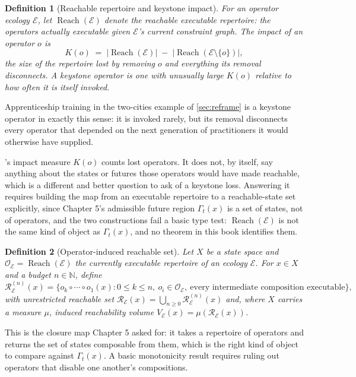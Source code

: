 \documentclass[12pt]{report}
\newtheorem{definition}{Definition}[section]
\newcommand{\Reach}{\ensuremath{\operatorname{Reach}}}
\begin{document}
\begin{definition}[Reachable repertoire and keystone impact]
\label{def:keystone}
For an operator ecology $\mathcal{E}$, let $\Reach(\mathcal{E})$ denote
the reachable executable repertoire: the operators actually executable
given $\mathcal{E}$'s current constraint graph. The \emph{impact} of an
operator $o$ is
\[
K(o) \;=\; \bigl|\Reach(\mathcal{E})\bigr| \;-\; \bigl|\Reach(\mathcal{E}\setminus\{o\})\bigr|,
\]
the size of the repertoire lost by removing $o$ and everything its
removal disconnects. A \emph{keystone operator} is one with unusually
large $K(o)$ relative to how often it is itself invoked.
\end{definition}

Apprenticeship training in the two-cities example of \cref{sec:reframe}
is a keystone operator in exactly this sense: it is invoked rarely, but
its removal disconnects every operator that depended on the next
generation of practitioners it would otherwise have supplied.

's impact measure $K(o)$ counts lost operators. It
does not, by itself, say anything about the states or futures those
operators would have made reachable, which is a different and better
question to ask of a keystone loss. Answering it requires building the
map from an executable repertoire to a reachable-state set explicitly,
since Chapter 5's admissible future region $\Gamma_t(x)$ is a set of
states, not of operators, and the two constructions fail a basic type
test: $\Reach(\mathcal{E})$ is not the same kind of object as
$\Gamma_t(x)$, and no theorem in this book identifies them.

\begin{definition}[Operator-induced reachable set]
\label{def:operator-induced-reach}
Let $X$ be a state space and $\mathcal{O}_\mathcal{E} = \Reach(\mathcal{E})$
the currently executable repertoire of an ecology $\mathcal{E}$. For
$x \in X$ and a budget $n \in \mathbb{N}$, define
\[
\mathcal{R}_\mathcal{E}^{(n)}(x) = \bigl\{ o_k \circ \cdots \circ o_1(x) :
0 \leq k \leq n,\ o_i \in \mathcal{O}_\mathcal{E},\ \text{every intermediate
composition executable} \bigr\},
\]
with unrestricted reachable set $\mathcal{R}_\mathcal{E}(x) =
\bigcup_{n \geq 0} \mathcal{R}_\mathcal{E}^{(n)}(x)$ and, where $X$ carries
a measure $\mu$, induced reachability volume $V_\mathcal{E}(x) =
\mu(\mathcal{R}_\mathcal{E}(x))$.
\end{definition}

This is the closure map Chapter 5 asked for: it takes a repertoire of
operators and returns the set of states composable from them, which is
the right kind of object to compare against $\Gamma_t(x)$. A basic
monotonicity result requires ruling out operators that disable one
another's compositions.
\end{document}
